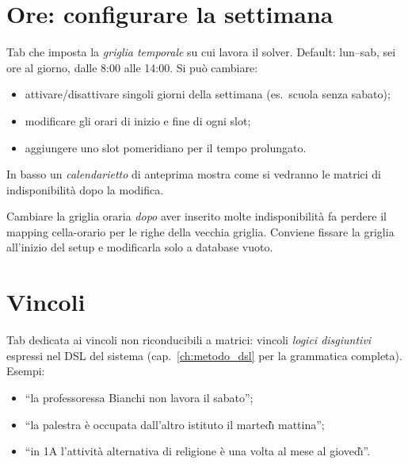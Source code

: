 \section{Ore: configurare la settimana}
\label{sec:tab_ore}

Tab che imposta la \emph{griglia temporale} su cui lavora il
solver. Default: lun--sab, sei ore al giorno, dalle 8:00 alle
14:00. Si pu\`o cambiare:

\begin{itemize}
\item attivare/disattivare singoli giorni della settimana
  (es.\ scuola senza sabato);
\item modificare gli orari di inizio e fine di ogni slot;
\item aggiungere uno slot pomeridiano per il tempo prolungato.
\end{itemize}

In basso un \emph{calendarietto} di anteprima mostra come si
vedranno le matrici di indisponibilit\`a dopo la modifica.

\begin{avvertenzabox}
Cambiare la griglia oraria \emph{dopo} aver inserito molte
indisponibilit\`a fa perdere il mapping cella-orario per le
righe della vecchia griglia. Conviene fissare la griglia
all'inizio del setup e modificarla solo a database vuoto.
\end{avvertenzabox}


\section{Vincoli}
\label{sec:tab_vincoli}

Tab dedicata ai vincoli non riconducibili a matrici: vincoli
\emph{logici disgiuntivi} espressi nel DSL del sistema
(cap.~\ref{ch:metodo_dsl} per la grammatica completa). Esempi:

\begin{itemize}
\item ``la professoressa Bianchi non lavora il sabato'';
\item ``la palestra \`e occupata dall'altro istituto il
  marted\`{\i} mattina'';
\item ``in 1A l'attivit\`a alternativa di religione \`e una
  volta al mese al gioved\`{\i}''.
\end{itemize}

